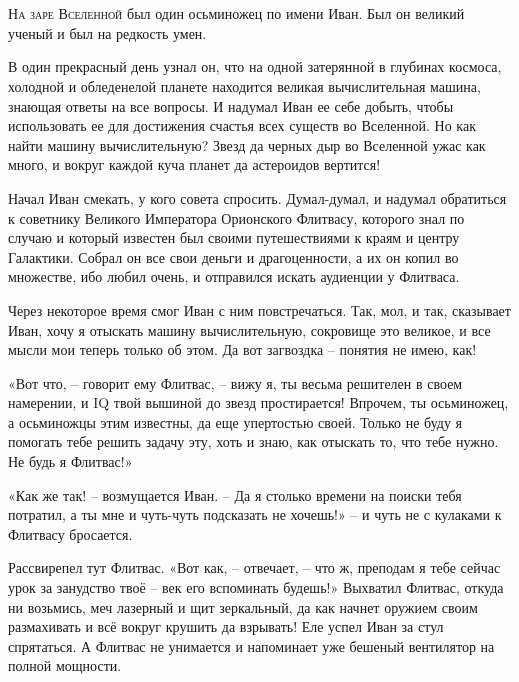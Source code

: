 \documentclass[ebook,oneside,final,openright]{memoir}
\begin{document}
\chapter{}
 \lettrine{Н}{а заре Вселенной} был один осьминожец по имени Иван. Был он великий ученый и был на редкость умен.\par
\par
В один прекрасный день узнал он, что на одной затерянной в глубинах космоса, холодной и обледенелой планете находится великая вычислительная машина, знающая ответы на все вопросы. И надумал Иван ее себе добыть, чтобы использовать ее для достижения счастья всех существ во Вселенной. Но как найти машину вычислительную? Звезд да черных дыр во Вселенной ужас как много, и вокруг каждой куча планет да астероидов вертится!\par
\par
Начал Иван смекать, у кого совета спросить. Думал-думал, и надумал обратиться к советнику Великого Императора Орионского Флитвасу, которого знал по случаю и который известен был своими путешествиями к краям и центру Галактики. Собрал он все свои деньги и драгоценности, а их он копил во множестве, ибо любил очень, и отправился искать аудиенции у Флитваса.\par
\par
Через некоторое время смог Иван с ним повстречаться. Так, мол, и так, сказывает Иван, хочу я отыскать машину вычислительную, сокровище это великое, и все мысли мои теперь только об этом. Да вот загвоздка – понятия не имею, как!\par
\par
«Вот что, – говорит ему Флитвас, – вижу я, ты весьма решителен в своем намерении, и IQ твой вышиной до звезд простирается! Впрочем, ты осьминожец, а осьминожцы этим известны, да еще упертостью своей. Только не буду я помогать тебе решить задачу эту, хоть и знаю, как отыскать то, что тебе нужно. Не будь я Флитвас!» \par
\par
«Как же так! – возмущается Иван. – Да я столько времени на поиски тебя потратил, а ты мне и чуть-чуть подсказать не хочешь!» – и чуть не с кулаками к Флитвасу бросается. \par
\par
Рассвирепел тут Флитвас. «Вот как, – отвечает, – что ж, преподам я тебе сейчас урок за занудство твоё – век его вспоминать будешь!» Выхватил Флитвас, откуда ни возьмись, меч лазерный и щит зеркальный, да как начнет оружием своим размахивать и всё вокруг крушить да взрывать! Еле успел Иван за стул спрятаться. А Флитвас не унимается и напоминает уже бешеный вентилятор на полной мощности. \par
\end{document}
